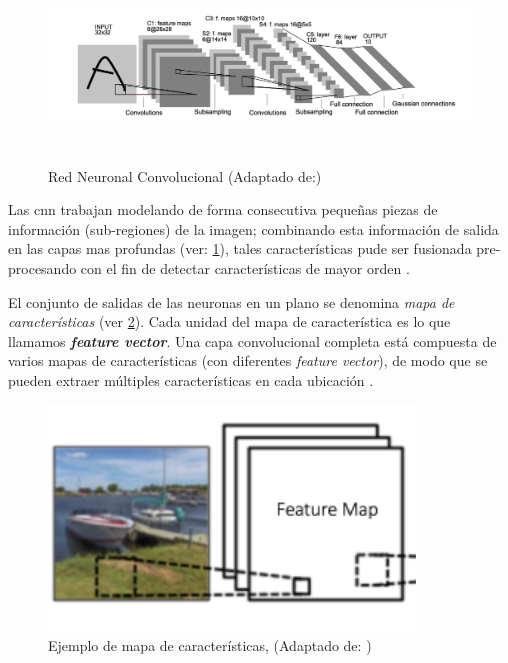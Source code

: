 \begin{figure}[h]
 \centering
  \includegraphics[height=5cm,keepaspectratio=true,clip=true]{imagenes/Logos/cnnconv.png}
  \caption{Red Neuronal Convolucional (Adaptado de:\citep{cnns})}
	\label{Fig: redconvolucion}
\end{figure}

Las \ac{cnn} trabajan modelando de forma consecutiva pequeñas piezas de información (sub-regiones) de la imagen; combinando esta información de salida en las capas mas profundas (ver: \ref{Fig: redconvolucion}), tales características pude ser fusionada pre-procesando con el fin de detectar características de mayor orden \citep{murphy}.


El conjunto de salidas de las neuronas en un plano se denomina \textit{mapa de características} (ver \ref{Fig: fmaps}). Cada unidad  del mapa de característica es lo que llamamos  \textit{\textbf{feature vector}}. Una capa convolucional completa está compuesta de varios mapas de características (con diferentes 
\textit{feature vector}), de modo que se pueden extraer múltiples características en cada ubicación \citep{cnns}.

\begin{figure}[H]
 \centering
  \includegraphics[height=6cm,keepaspectratio=true,clip=true]{imagenes/Logos/fmaps.png}
  \caption{Ejemplo de mapa de características, (Adaptado de: \citep{cnnsarticle})}
	\label{Fig: fmaps}
\end{figure}

